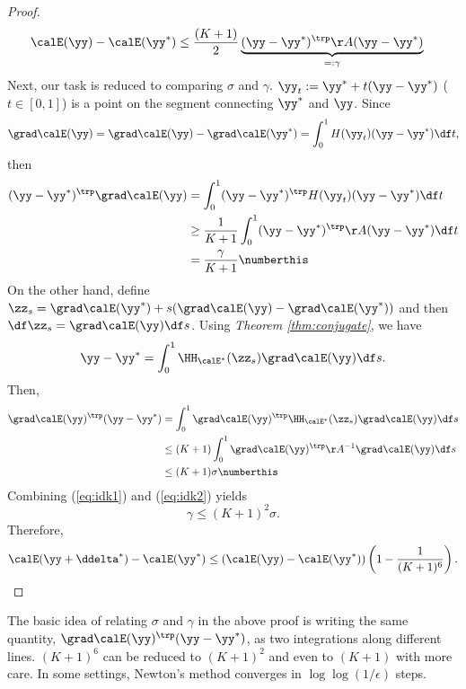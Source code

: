 \begin{proof}
\begin{align*}
    \calE(\yy)-\calE(\yy^*) &\leq \frac{(K+1)}{2}\underbrace{(\yy-\yy^*)^\trp\AA(\yy-\yy^*)}_{=:\gamma}
  \end{align*}
  Next, our task is reduced to comparing $\sigma$ and $\gamma$.
  $\yy_t := \yy^* + t(\yy-\yy^*)$ ($t\in[0,1]$) is a point on the segment connecting $\yy^*$ and $\yy$. Since
  \[ \grad\calE(\yy) = \grad\calE(\yy) - \grad\calE(\yy^*) = \int_{0}^{1} H(\yy_t)(\yy-\yy^*)\df t, \]
  then
  \begin{align*}
    (\yy-\yy^*)^\trp\grad\calE(\yy)
    &= \int_{0}^{1} (\yy-\yy^*)^\trp H(\yy_t)(\yy-\yy^*)\df t \\
    &\geq \frac{1}{K+1}\int_{0}^{1} (\yy-\yy^*)^\trp\AA(\yy-\yy^*)\df t \\
    &= \frac{\gamma}{K+1} \numberthis \label{eq:idk1}
  \end{align*}
  On the other hand, define $\zz_s = \grad\calE(\yy^*) + s(\grad\calE(\yy)-\grad\calE(\yy^*))$ and then $\df\zz_s = \grad\calE(\yy)\df s$.
  Using \emph{Theorem \ref{thm:conjugate}}, we have
  \[ \yy-\yy^* = \int_{0}^{1} \HH_{\calE^*}(\zz_s) \grad\calE(\yy) \df s.\]
  Then,
  \begin{align*}
    \grad\calE(\yy)^\trp(\yy-\yy^*)
    &= \int_{0}^{1} \grad\calE(\yy)^\trp \HH_{\calE^*}(\zz_s) \grad\calE(\yy) \df s \\
    &\leq (K+1)\int_{0}^{1} \grad\calE(\yy)^\trp \AA^{-1} \grad\calE(\yy) \df s \\
    &\leq (K+1)\sigma \numberthis \label{eq:idk2}
  \end{align*}
  Combining (\ref{eq:idk1}) and (\ref{eq:idk2}) yields
  \[ \gamma \leq (K+1)^2\sigma. \]
  Therefore,
  \[ \calE(\yy+\ddelta^*)-\calE(\yy^*) \leq (\calE(\yy)-\calE(\yy^*))\left(1-\frac{1}{(K+1)^6}\right). \]
\end{proof}

\begin{remark}
  The basic idea of relating $\sigma$ and $\gamma$ in the above proof is writing the same quantity, $\grad\calE(\yy)^\trp(\yy-\yy^*)$,  as two integrations along different lines.
  $(K+1)^6$ can be reduced to $(K+1)^2$ and even to $(K+1)$ with more care.
  In some settings, Newton's method converges in $\log\log(1/\epsilon)$ steps.
\end{remark}

